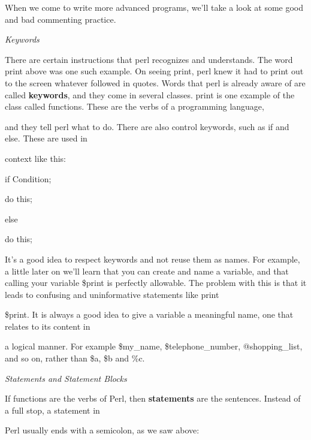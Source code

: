 \documentclass[a4paper,11pt]{book}
\begin{document}
\noindent 

\noindent When we come to  write  more  advanced  programs,  we'll  take  a  look at  some  good  and  bad commenting practice.

\noindent 

\noindent \textit{Keywords}

\noindent There are certain instructions that perl recognizes and understands. The word print above was one such example. On seeing print, perl knew it had to print out to the screen whatever followed in quotes. Words that perl is already aware of are called \textbf{keywords}, and they come in several classes. print is one example of the class called functions.  These are the verbs of a programming language,

\noindent and they tell perl what to do. There are also control keywords, such as if and else. These are used in

\noindent context like this:

\noindent 

\noindent if Condition;

\noindent do this;

\noindent 

\noindent else

\noindent do this;

\noindent 

\noindent It's a good idea to respect keywords and not reuse them as names. For example, a little later on we'll learn that you can create and name a variable, and that calling your variable \$print is perfectly allowable. The problem with this is that it leads to confusing and uninformative statements like print

\noindent \$print. It is always a good idea to give a variable a meaningful name, one that relates to its content in

\noindent a logical manner. For example \$my\_name, \$telephone\_number, @shopping\_list, and so on, rather than \$a, \$b and \%c.

\noindent 

\noindent \textit{Statements and Statement Blocks}

\noindent If functions are the verbs of Perl, then \textbf{statements }are the sentences. Instead of a full stop, a statement in

\noindent Perl usually ends with a semicolon, as we saw above:

\noindent 

\noindent 
\end{document}
